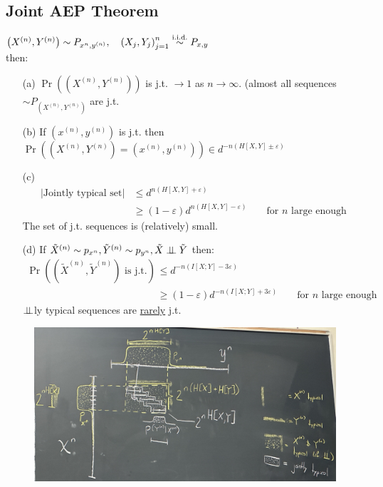 \subsection{Joint AEP Theorem}
$\left(X^{(n)}, Y^{(n)}\right)\sim P_{x^n, y^{(n)}}, \quad \left(X_j, Y_j\right)_{j=1}^n\overset{\text{i.i.d.}}{\sim} P_{x, y}$\\
then: 
\begin{enumerate}
    \item[(a)] $\Pr(\left(X^{(n)}, Y^{(n)}\right))$ is j.t. $\to1$ as $n\to\infty$. (almost all sequences $\sim P_{\left(X^{(n)}, Y^{(n)}\right)}$ are j.t.
    \item[(b)] If $\left(x^{(n)}, y^{(n)}\right)$ is j.t. then $\Pr(\left(X^{(n)}, Y^{(n)}\right)=\left(x^{(n)}, y^{(n)}\right))\in d^{-n(H[X, Y] \pm \varepsilon)}$
    \item[(c)] 
    \begin{align*}
    |\text{Jointly typical set}| 
        &\leq d^{n(H[X, Y] + \varepsilon)}
        \\
        &\geq (1-\varepsilon) d^{n(H[X, Y]-\varepsilon)}
        &&\text{ for $n$ large enough}
    \end{align*}
The set of j.t. sequences is (relatively) small.
\item[(d)] If $\tilde{X}^{(n)}\sim p_{x^n}, \tilde{Y}^{(n)}\sim p_{y^n}, \tilde{X}\mathrel{\perp\!\!\!\perp} \tilde{Y}$ then: 
\begin{align*}
\Pr(\left(\tilde{X}^{(n)}, \tilde{Y}^{(n)}\right)\text{ is j.t.})
    &\leq d^{-n(I[X; Y] - 3\varepsilon)}
    \\
    &\geq (1-\varepsilon) d^{-n(I[X; Y] + 3\varepsilon)}
        &&\text{ for $n$ large enough}
\end{align*}
$\mathrel{\perp\!\!\!\perp}$ly typical sequences are \underline{rarely} j.t.
\end{enumerate}

\begin{figure}[h]
    \centering
    \includegraphics[scale=0.14]{lectures/wk13/img/strip.jpg}
    \label{fig:strip}
\end{figure}


